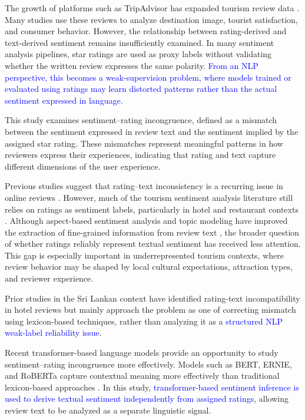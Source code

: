 \documentclass[conference]{IEEEtran}
\newcommand{\changed}[1]{\textcolor{blue}{#1}}
\begin{document}
The growth of platforms such as TripAdvisor has expanded tourism review data \cite{George}. Many studies use these reviews to analyze destination image, tourist satisfaction, and consumer behavior. However, the relationship between rating-derived and text-derived sentiment remains insufficiently examined. In many sentiment analysis pipelines, star ratings are used as proxy labels without validating whether the written review expresses the same polarity. \changed{From an NLP perspective, this becomes a weak-supervision problem, where models trained or evaluated using ratings may learn distorted patterns rather than the actual sentiment expressed in language.}

This study examines sentiment--rating incongruence, defined as a mismatch between the sentiment expressed in review text and the sentiment implied by the assigned star rating. These mismatches represent meaningful patterns in how reviewers express their experiences, indicating that rating and text capture different dimensions of the user experience.

Previous studies suggest that rating--text inconsistency is a recurring issue in online reviews \cite{Bigne,Kwon}. However, much of the tourism sentiment analysis literature still relies on ratings as sentiment labels, particularly in hotel and restaurant contexts \cite{alaei,Ameur}. Although aspect-based sentiment analysis and topic modeling have improved the extraction of fine-grained information from review text \cite{Chu2022,Ali}, the broader question of whether ratings reliably represent textual sentiment has received less attention. This gap is especially important in underrepresented tourism contexts, where review behavior may be shaped by local cultural expectations, attraction types, and reviewer experience.

Prior studies in the Sri Lankan context have identified rating-text incompatibility in hotel reviews but mainly approach the problem as one of correcting mismatch using lexicon-based techniques, rather than analyzing it as a \changed{structured NLP weak-label reliability issue}.

Recent transformer-based language models provide an opportunity to study sentiment--rating incongruence more effectively. Models such as BERT, ERNIE, and RoBERTa capture contextual meaning more effectively than traditional lexicon-based approaches \cite{Wen,Puh,Devlin,Sun}. In this study, \changed{transformer-based sentiment inference is used to derive textual sentiment independently from assigned ratings}, allowing review text to be analyzed as a separate linguistic signal.
\end{document}
